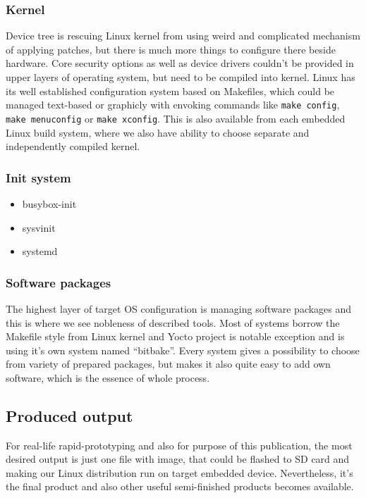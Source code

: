 \documentclass[printmode]{mgr}
\begin{document}
\subsubsection{Kernel}
Device tree is rescuing Linux kernel from using weird and complicated mechanism of applying patches, but there is much more things to configure there beside hardware. Core security options as well as device drivers couldn't be provided in upper layers of operating system, but need to be compiled into kernel. Linux has its well established configuration system based on Makefiles, which could be managed text-based or graphicly with envoking commands like \verb|make config|, \verb|make menuconfig| or \verb|make xconfig|. This is also available from each embedded Linux build system, where we also have ability to choose separate and independently compiled kernel.

\subsubsection{Init system}
\begin{itemize}
    \item busybox-init
    \item sysvinit
    \item systemd
\end{itemize}

\subsubsection{Software packages}
The highest layer of target OS configuration is managing software packages and this is where we see nobleness of described tools. Most of systems borrow the Makefile style from Linux kernel and Yocto project is notable exception and is using it's own system named ``bitbake''. Every system gives a possibility to choose from variety of prepared packages, but makes it also quite easy to add own software, which is the essence of whole process.

\subsection{Produced output}
For real-life rapid-prototyping and also for purpose of this publication, the most desired output is just one file with image, that could be flashed to SD card and making our Linux distribution run on target embedded device. Nevertheless, it's the final product and also other useful semi-finished products becomes available.
\end{document}
